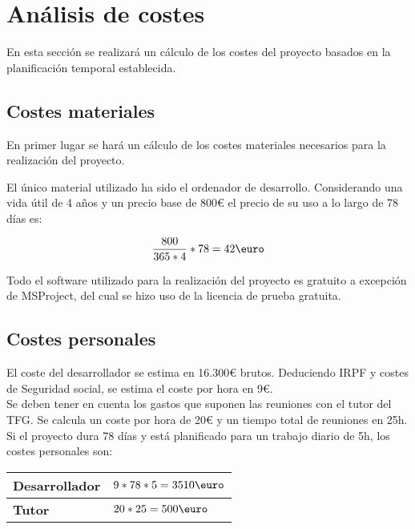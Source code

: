 \section{Análisis de costes}

En esta sección se realizará un cálculo de los costes del proyecto basados en la planificación temporal establecida.\\

\subsection{Costes materiales}

En primer lugar se hará un cálculo de los costes materiales necesarios para la realización del proyecto.

El único material utilizado ha sido el ordenador de desarrollo. Considerando una vida útil de 4 años y un precio base de 800{\euro} el precio de su uso a lo largo de 78 días es:

\begin{equation}
    \frac{800}{365*4} * 78 = 42\mbox{\euro}
\end{equation}

Todo el software utilizado para la realización del proyecto es gratuito a excepción de MSProject, del cual se hizo uso de la licencia de prueba gratuita.

\subsection{Costes personales}

El coste del desarrollador se estima en 16.300{\euro} brutos. Deduciendo IRPF y costes de Seguridad social, se estima el coste por hora en 9{\euro}.\\

Se deben tener en cuenta los gastos que suponen las reuniones con el tutor del TFG. Se calcula un coste por hora de 20{\euro} y un tiempo total de reuniones en 25h.\\

Si el proyecto dura 78 días y está planificado para un trabajo diario de 5h, los costes personales son:\\

\begin{tabularx}{\linewidth}{|p{3cm}|X|}
    \hline
    \textbf{Desarrollador} & $9*78*5=3510\mbox{\euro}$ \tabularnewline
    \hline
    \textbf{Tutor} & $20*25=500\mbox{\euro}$ \tabularnewline
    \hline
\end{tabularx}

